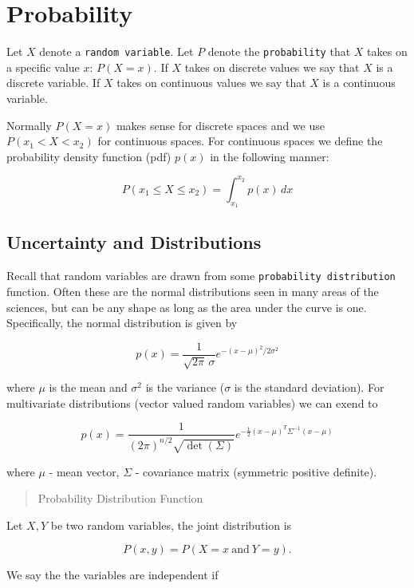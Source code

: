 \hypertarget{probability}{%
\section{Probability}\label{probability}}

Let \(X\) denote a \texttt{random\ variable}. Let \(P\) denote the
\texttt{probability} that \(X\) takes on a specific value \(x\):
\(P(X=x)\). If \(X\) takes on discrete values we say that \(X\) is a
discrete variable. If \(X\) takes on continuous values we say that \(X\)
is a continuous variable.

Normally \(P(X=x)\) makes sense for discrete spaces and we use \(P(x_1 <
X < x_2)\) for continuous spaces. For continuous spaces we define the
probability density function (pdf) \(p(x)\) in the following manner:

\[P(x_1 \leq X \leq x_2) = \int_{x_1}^{x_2} p(x)\, dx\]

\hypertarget{uncertainty-and-distributions}{%
\subsection{Uncertainty and
Distributions}\label{uncertainty-and-distributions}}

Recall that random variables are drawn from some \texttt{probability
distribution} function. Often these are the normal distributions seen in
many areas of the sciences, but can be any shape as long as the area
under the curve is one. Specifically, the normal distribution is given
by

\[p(x) = \frac{1}{\sqrt{2\pi}\, \sigma}e^{-(x-\mu)^2/2\sigma^2}\]

where \(\mu\) is the mean and \(\sigma^2\) is the variance (\(\sigma\)
is the standard deviation). For multivariate distributions (vector
valued random variables) we can exend to

\[p(x) = \frac{1}{(2\pi)^{n/2}\sqrt{\det(\Sigma)}}e^{-\frac{1}{2}(x-\mu)^T\Sigma^{-1}(x-\mu)}\]

where \(\mu\) - mean vector, \(\Sigma\) - covariance matrix (symmetric
positive definite).

\begin{quote}
Probability Distribution Function
\end{quote}

Let \(X,Y\) be two random variables, the joint distribution is

\[P(x,y) = P(X=x~\mbox{and}~Y=y).\]

We say the the variables are independent if


